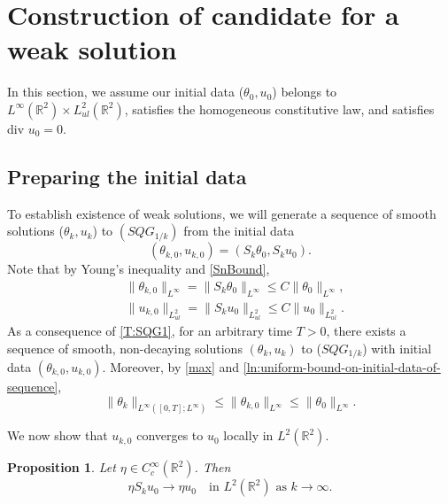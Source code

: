 \documentclass[11pt,reqno,xcolor=svgnames]{amsart}
\def\R{{\mathbb R}}
\theoremstyle{plain}
\newtheorem{prop}[theorem]{Proposition}
\theoremstyle{definition}
\theoremstyle{plain}
\theoremstyle{remark}
\begin{document}
\section{Construction of candidate for a weak solution}\label{S:SolutionCandidate}

In this section, we assume our initial data ($\theta_{0},u_{0}$) belongs to $L^{\infty}(\R^2)\times L^2_{ul}(\R^2)$, satisfies the homogeneous constitutive law, and satisfies div $u_0=0$.
\subsection{Preparing the initial data}
To establish existence of weak solutions, we will generate a sequence of smooth solutions ($\theta_k, u_k$) to $(SQG_{1/k})$ from the initial data $$(\theta_{k,0},u_{k,0})=(S_k\theta_{0}, S_k u_{0}).$$  Note that by Young's inequality and \cref{SnBound},
\begin{equation} \label{ln:uniform-bound-on-initial-data-of-sequence}
\begin{split}
&\| \theta_{k,0} \|_{L^{\infty}} = \| S_k\theta_{0} \|_{L^{\infty}} \leq C \| \theta_0 \|_{L^{\infty}}, \\
&\| u_{k,0} \|_{L^2_{ul}} = \| S_ku_{0} \|_{L^2_{ul}} \leq C \| u_{0} \|_{L^2_{ul}}.
\end{split}
\end{equation}
As a consequence of \cref{T:SQG1}, for an arbitrary time $T>0$, there exists a sequence of smooth, non-decaying solutions $(\theta_k, u_k)$ to ($SQG_{1/k}$) with initial data $(\theta_{k,0}, u_{k,0})$.  
 Moreover, by \cref{max} and \cref{ln:uniform-bound-on-initial-data-of-sequence},
\begin{equation}\label{ln:uniform-bound-on-theta-k}
    \|\theta_k\|_{L^\infty([0,T]; L^{\infty})} \leq \|\theta_{k,0}\|_{L^\infty} \leq \|\theta_0\|_{L^\infty}.
\end{equation}

We now show that $u_{k,0}$ converges to $u_0$ locally in $L^2(\R^2)$.


\begin{prop}\label{prop:convergence-of-initial-data-u}
Let $\eta\in C^{\infty}_c(\R^2)$.  Then $$ \eta S_k u_0 \rightarrow  \eta u_0 \quad \text{in }L^2(\R^2) \text{ as }k\rightarrow\infty.$$
\end{prop}
\end{document}
